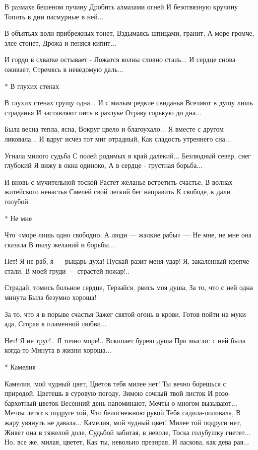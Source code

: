 В размахе бешеном пучину
Дробить алмазами огней
И безотвязную кручину
Топить в дни пасмурные в ней...

В объятьях волн прибрежных тонет,
Вздымаясь шпицами, гранит,
А море громче, злее стонет,
Дрожа и пеняся кипит...

И гордо в схватке остывает -
Ложатся волны словно сталь...
И сердце снова оживает,
Стремясь в неведомую даль...


* В глухих стенах

В глухих стенах грущу одна...
И с милым редкие свиданья
Вселяют в душу лишь страданья
И заставляют пить в разлуке
Отраву горькую до дна...

Была весна тепла, ясна,
Вокруг цвело и благоухало...
Я вместе с другом ликовала...
И вдруг исчез тот миг отрадный,
Как сладость утреннего сна...

Угнала милого судьба
С полей родимых в край далекий...
Безлюдный север, снег глубокий
Я вижу в окна одиноко,
А в сердце - грустная борьба...

И вновь с мучительной тоской
Растет желанье встретить счастье,
В волнах житейского ненастья
Смелей свой легкий бег направить
К свободе, к дали голубой...


* Не мне

Что «море лишь одно свободно,
А люди — жалкие рабы» —
Не мне, не мне она сказала
В пылу желаний и борьбы...

Нет! Я не раб, я — рыцарь духа!
Пускай разит меня удар!
Я, закаленный крепче стали,
В моей груди — страстей пожар!..

Страдай, томись больное сердце,
Терзайся, рвись моя душа,
За то, что с ней одна минута
Была безумно хороша!

За то, что я в порыве счастья
Зажег святой огонь в крови,
Готов пойти на муки ада,
Сгорая в пламенной любви...

Нет! Я не трус!.. Я точно море!..
Вскипает бурею душа
При мысли: с ней была когда-то
Минута в жизни хороша...


* Камелия

Камелия, мой чудный цвет,
Цветов тебя милее нет!
Ты вечно борешься с природой,
Цветешь в суровую погоду,
Зимою сочный твой листок
И розо-бархотный цветок
Весенний день напоминают,
Мечты о многом вызывают...
Мечты летят к подруге той,
Что белоснежною рукой
Тебя садила-поливала,
В жару увянуть не давала...
Камелия, мой чудный цвет!
Милее той подруги нет,
Живет она в тяжелой доле,
Судьбой забитая, в неволе,
Тоска голубушку гнетет...
Но, все же, милая, цветет,
Как ты, невольно презирая,
И ласкова, как дева рая...


